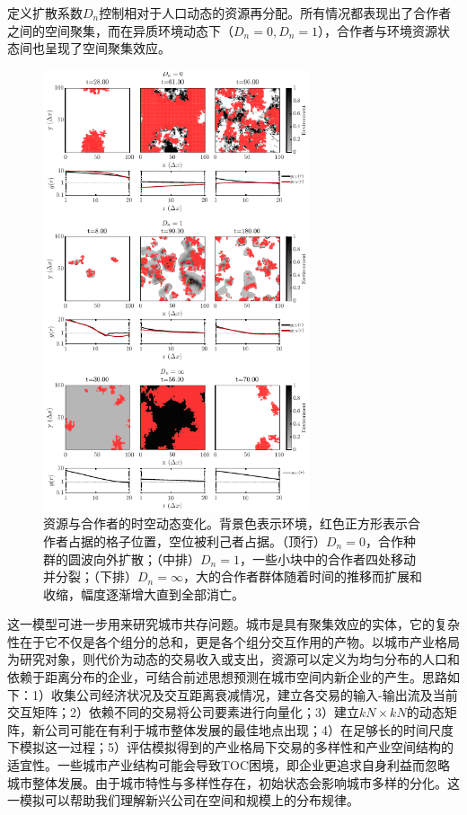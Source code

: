 定义扩散系数$D_n$控制相对于人口动态的资源再分配。所有情况都表现出了合作者之间的空间聚集，而在异质环境动态下（$D_n=0, D_n=1$），合作者与环境资源状态间也呈现了空间聚集效应。
\begin{figure}
	\label{conevol}
	\centering
	\includegraphics[width=0.7\textwidth]{pictures/D_N}
	\caption{资源与合作者的时空动态变化。背景色表示环境，红色正方形表示合作者占据的格子位置，空位被利己者占据。（顶行）$D_n=0$，合作种群的圆波向外扩散；（中排）$D_n=1$，一些小块中的合作者四处移动并分裂；（下排）$D_n=\infty$，大的合作者群体随着时间的推移而扩展和收缩，幅度逐渐增大直到全部消亡。}
\end{figure}

这一模型可进一步用来研究城市共存问题。城市是具有聚集效应的实体，它的复杂性在于它不仅是各个组分的总和，更是各个组分交互作用的产物。以城市产业格局为研究对象，则代价为动态的交易收入或支出，资源可以定义为均匀分布的人口和依赖于距离分布的企业，可结合前述思想预测在城市空间内新企业的产生。思路如下：1）收集公司经济状况及交互距离衰减情况，建立各交易的输入-输出流及当前交互矩阵；2）依赖不同的交易将公司要素进行向量化；3）建立$kN\times kN$的动态矩阵，新公司可能在有利于城市整体发展的最佳地点出现；4）在足够长的时间尺度下模拟这一过程；5）评估模拟得到的产业格局下交易的多样性和产业空间结构的适宜性。一些城市产业结构可能会导致TOC困境，即企业更追求自身利益而忽略城市整体发展。由于城市特性与多样性存在，初始状态会影响城市多样的分化。这一模拟可以帮助我们理解新兴公司在空间和规模上的分布规律。

